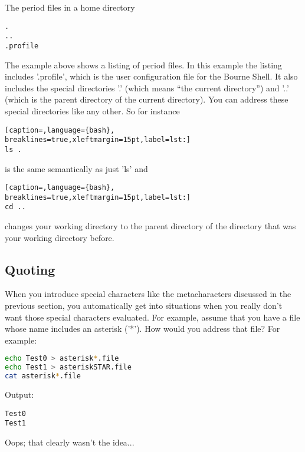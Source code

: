 The period files in a home directory
\scriptsize
\begin{verbatim}
.
..
.profile
\end{verbatim}
\normalsize

The example above shows a listing of period files. In this example the listing
includes '.profile', which is the user configuration file for the Bourne Shell.
It also includes the special directories '.' (which means ``the current
directory'') and '..' (which is the parent directory of the current directory).
You can address these special directories like any other. So for instance
\lstset{basicstyle=\scriptsize, numbers=left, captionpos=b, tabsize=4}
\begin{lstlisting}[caption=,language={bash},
breaklines=true,xleftmargin=15pt,label=lst:]
ls .
\end{lstlisting}

is the same semantically as just 'ls' and 
\lstset{basicstyle=\scriptsize, numbers=left, captionpos=b, tabsize=4}
\begin{lstlisting}[caption=,language={bash},
breaklines=true,xleftmargin=15pt,label=lst:]
cd ..
\end{lstlisting}

changes your working directory to the parent directory of the directory that
was your working directory before.

\subsection{Quoting}
When you introduce special characters like the metacharacters discussed in the
previous section, you automatically get into situations when you really don't
want those special characters evaluated. For example, assume that you have a
file whose name includes an asterisk ('*'). How would you address that file?
For example:
\lstset{basicstyle=\scriptsize, numbers=left, captionpos=b, tabsize=4}
\begin{lstlisting}[caption=Metacharacters in file names can cause problems,language={bash},
breaklines=true,xleftmargin=15pt,label=lst:Metacharacters in file names can cause problems]
echo Test0 > asterisk*.file
echo Test1 > asteriskSTAR.file
cat asterisk*.file
\end{lstlisting}

Output:
\scriptsize
\begin{verbatim}
Test0
Test1
\end{verbatim}
\normalsize
Oops; that clearly wasn't the idea...

